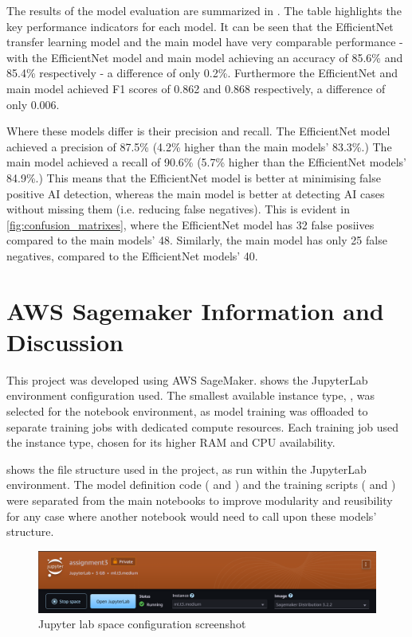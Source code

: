 The results of the model evaluation are summarized in . The table highlights the key performance indicators for each model. It can be seen that the EfficientNet transfer learning model and the main model have very comparable performance - with the EfficientNet model and main model achieving an accuracy of 85.6\% and 85.4\% respectively - a difference of only 0.2\%. Furthermore the EfficientNet and main model achieved F1 scores of 0.862 and 0.868 respectively, a difference of only 0.006.

Where these models differ is their precision and recall. The EfficientNet model achieved a precision of 87.5\% (4.2\% higher than the main models' 83.3\%.) The main model achieved a recall of 90.6\% (5.7\% higher than the EfficientNet models' 84.9\%.) This means that the EfficientNet model is better at minimising false positive AI detection, whereas the main model is better at detecting AI cases without missing them (i.e. reducing false negatives). This is evident in \cref{fig:confusion_matrixes}, where the EfficientNet model has 32 false posiives compared to the main models' 48. Similarly, the main model has only 25 false negatives, compared to the EfficientNet models' 40.

\newpage

\section{AWS Sagemaker Information and Discussion} \label{sec:aws_reflection}

This project was developed using AWS SageMaker.  shows the JupyterLab environment configuration used. The smallest available instance type, , was selected for the notebook environment, as model training was offloaded to separate training jobs with dedicated compute resources. Each training job used the  instance type, chosen for its higher RAM and CPU availability.

 shows the file structure used in the project, as run within the JupyterLab environment. The model definition code ( and ) and the training scripts ( and ) were separated from the main notebooks to improve modularity and reusibility for any case where another notebook would need to call upon these models' structure.


\begin{figure}[h]
    \centering
    \includegraphics[width=0.8\linewidth]{figures/jupyter_lab_space_config.png} %
    \centering
    \caption{Jupyter lab space configuration screenshot} %
    \label{fig:jupyter_lab_space_config} %
\end{figure}

